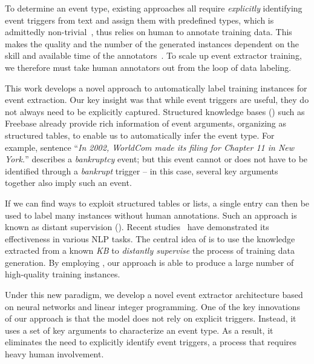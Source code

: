 To determine an event type, existing approaches  all require \emph{explicitly} identifying event triggers from text and assign them with predefined types, %
which is admittedly non-trivial~\FIXME{\cite{}}, thus relies on human to annotate training data.
This makes the quality and the number of the generated instances dependent on the skill and available time of the
annotators~\cite{aguilar2014comparison,song2015light}. To scale up event extractor training, we therefore must take human annotators out
from the loop of data labeling.


This work develops a novel approach to automatically label training instances for event extraction. Our key insight was that while event
triggers are useful, they do not always need to be explicitly captured. Structured knowledge bases (\KBs) such as Freebase already provide
rich information of event arguments, organizing as structured tables, to enable us to automatically infer the event type. For example,
sentence ``\textit{In 2002, WorldCom made its filing for Chapter 11 in New York.}'' describes a \emph{bankruptcy} event; but this event
cannot or does not have to be identified through a \emph{bankrupt} trigger -- in this case, several key arguments together also imply such
an event.



If we can find ways to exploit structured tables or lists, a single entry can then be used to label many instances without %
human annotations. Such an approach is known as distant supervision (\DS). Recent
studies~\cite{mintz2009distant,zeng2015distant} have demonstrated its effectiveness in various NLP tasks. The central idea of \DS is to use
the knowledge extracted from a known \textit{KB} to \emph{distantly supervise} the process of training data generation. %
By employing \DS, our approach is able to produce a large number of high-quality training instances.

Under this new \DS paradigm, we develop a novel event extractor architecture based on neural networks and linear integer programming. One
of the key innovations of our approach is that the model does not rely on explicit triggers. Instead, it uses a set of key arguments to
characterize an event type. As a result, it eliminates the need to explicitly identify event triggers, a process that requires heavy human
involvement.

